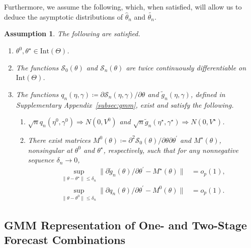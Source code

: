 \documentclass[12pt]{article}
\newtheorem{assumption}{Assumption}
\theoremstyle{definition}
\theoremstyle{remark}
\renewcommand{\appendixname}{Supplementary Appendix}
\begin{document}
Furthermore, we assume the following, which, when satisfied, will allow us to deduce the asymptotic distributions of $\hat\theta_{n}$ and $\tilde{\theta_{n}}$.

\begin{assumption}
\label{ast:dist}
The following are satisfied.

\begin{enumerate}
\item $\theta^0, \theta^{\star} \in \mathrm{Int}(\Theta)$.
\item The functions $\mathcal{S}_0(\theta)$ and $\mathcal{S}_{n}(\theta)$ are twice continuously differentiable on $\text{Int}(\Theta)$.
\item The functions $q_{n}(\eta,\gamma) \coloneqq \partial \mathcal{S}_{n}(\eta,\gamma)/\partial\theta$ and $\tilde{g}_{n}(\eta,\gamma)$, defined in \appendixname\ \ref{subsec:gmm}, exist and satisfy the following.
\begin{enumerate}
\item $\sqrt{n} q_{n}(\eta^0, \gamma^0) \Rightarrow N(0, V^0)$ and $\sqrt{n} \tilde{g}_{n}(\eta^\star, \gamma^\star) \Rightarrow N(0, V^\star)$.

\item There exist matrices $M^0(\theta) \coloneqq \partial^2 \mathcal{S}_0(\theta)/\partial \theta \partial \theta^{\prime}$ and $M^\star(\theta)$, nonsingular at $\theta^0$ and $\theta^\star$, respectively, such that for any nonnegative sequence $\delta_n \to 0$, 
\begin{align*}
\sup_{\| \theta - \theta^\star \| \leq \delta_n} \| \partial \tilde{g}_{n}(\theta)/\partial\theta^{\prime} - M^\star(\theta) \| &= o_p(1), \\
\sup_{\| \theta - \theta^0 \| \leq \delta_n} \| \partial {q}_{n}(\theta) / \partial \theta^{\prime}-M^0(\theta)\| &= o_p(1).
\end{align*}
\end{enumerate}
\end{enumerate}
\end{assumption}

\subsection{GMM Representation of One- and Two-Stage Forecast Combinations\label{subsec:gmm}}
\end{document}
